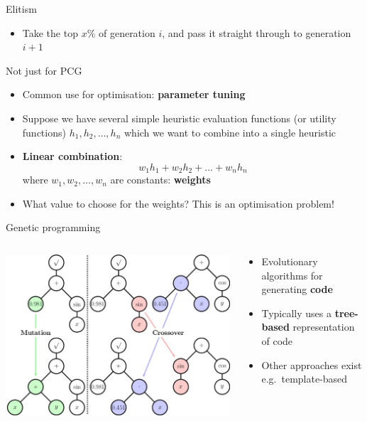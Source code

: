 \begin{frame}{Elitism}
	\begin{itemize}
		\pause\item Take the top $x\%$ of generation $i$, and pass it straight through to generation $i+1$
	\end{itemize}
\end{frame}

\begin{frame}{Not just for PCG}
	\begin{itemize}
		\pause\item Common use for optimisation: \textbf{parameter tuning}
		\pause\item Suppose we have several simple heuristic evaluation functions (or utility functions) $h_1, h_2, \dots, h_n$
			which we want to combine into a single heuristic
		\pause\item \textbf{Linear combination}:
			$$ w_1 h_1 + w_2 h_2 + \dots + w_n h_n $$
			where $w_1, w_2, \dots, w_n$ are constants: \textbf{weights}
		\pause\item What value to choose for the weights? This is an optimisation problem!
	\end{itemize}
\end{frame}

\begin{frame}{Genetic programming}
    \begin{columns}
        \begin{column}{0.48\textwidth}
            \pause\includegraphics[width=\textwidth]{genetic_programming}
        \end{column}
        \begin{column}{0.48\textwidth}
            \begin{itemize}
                \pause\item Evolutionary algorithms for generating \textbf{code}
                \pause\item Typically uses a \textbf{tree-based} representation of code
                \pause\item Other approaches exist e.g.\ template-based
            \end{itemize}
        \end{column}
    \end{columns}
\end{frame}
